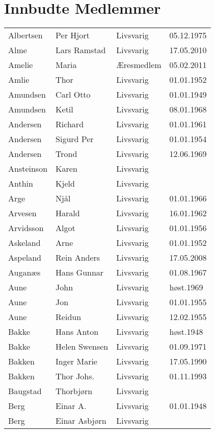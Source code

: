 \documentclass[fsbok.tex]{subfiles}
\begin{document}
\chapter*{Innbudte Medlemmer}

    \begin{longtable}{llll}
Albertsen	&	Per Hjort	&	Livsvarig 	&	05.12.1975	\\
Alme	&	Lars Ramstad	&	Livsvarig	&	17.05.2010	\\
Amelie	&	Maria		&	Æresmedlem	&	05.02.2011      \\
Amlie	&	Thor	&	Livsvarig 	&	01.01.1952	\\
Amundsen	&	Carl Otto	&	Livsvarig 	&	01.01.1949	\\
Amundsen	&	Ketil	&	Livsvarig 	&	08.01.1968	\\
Andersen	&	Richard	&	Livsvarig 	&	01.01.1961	\\
Andersen	&	Sigurd Per	&	Livsvarig 	&	01.01.1954	\\
Andersen	&	Trond	&	Livsvarig 	&	12.06.1969	\\
Ansteinson	&	Karen	&	Livsvarig 	&		\\
Anthin	&	Kjeld	&	Livsvarig 	&		\\
Arge	&	Njål	&	Livsvarig 	&	01.01.1966	\\
Arvesen	&	Harald	&	Livsvarig 	&	16.01.1962	\\
Arvidsson	&	Algot	&	Livsvarig 	&	01.01.1956	\\
Askeland	&	Arne	&	Livsvarig 	&	01.01.1952	\\
Aspeland	&	Rein Anders	&	Livsvarig	&	17.05.2008	\\
Auganæs	&	Hans Gunnar	&	Livsvarig 	&	01.08.1967	\\
Aune	&	John	&	Livsvarig 	&	høst.1969	\\
Aune	&	Jon	&	Livsvarig 	&	01.01.1955	\\
Aune	&	Reidun	&	Livsvarig 	&	12.02.1955	\\
Bakke	&	Hans Anton	&	Livsvarig	&	høst.1948	\\
Bakke	&	Helen Swensen	&	Livsvarig 	&	01.09.1971	\\
Bakken	&	Inger Marie	&	Livsvarig 	&	17.05.1990	\\
Bakken	&	Thor Johs.	&	Livsvarig 	&	01.11.1993	\\
Baugstad	&	Thorbjørn	&	Livsvarig 	&		\\
Berg	&	Einar A.	&	Livsvarig 	&	01.01.1948	\\
Berg	&	Einar Asbjørn	&	Livsvarig 	&		\\

\end{longtable}
\end{document}
